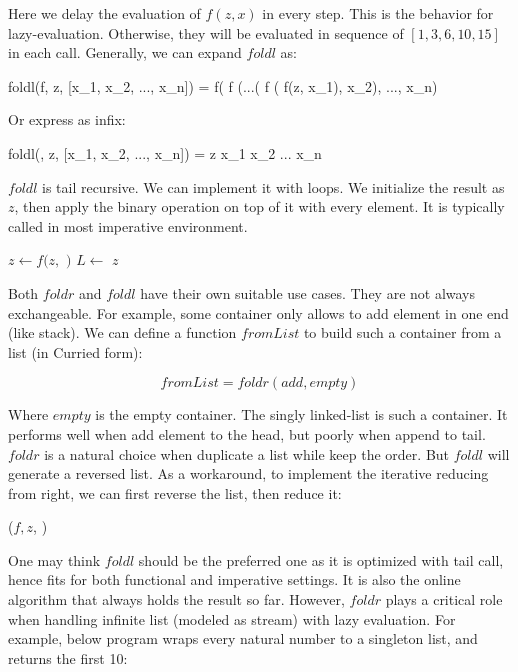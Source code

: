 \documentclass[b5paper]{article}
\begin{document}
Here we delay the evaluation of $f(z, x)$ in every step. This is the behavior for lazy-evaluation. Otherwise, they will be evaluated in sequence of $[1, 3, 6, 10, 15]$ in each call. Generally, we can expand $foldl$ as:

\be
foldl(f, z, [x_1, x_2, ..., x_n]) = f( f (...( f ( f(z, x_1), x_2), ..., x_n)
\ee

Or express as infix:

\be
foldl(\oplus, z, [x_1, x_2, ..., x_n]) = z \oplus x_1 \oplus x_2 \oplus ... \oplus x_n
\ee

$foldl$ is tail recursive. We can implement it with loops. We initialize the result as $z$, then apply the binary operation on top of it with every element. It is typically called  in most imperative environment.

\begin{algorithmic}[1]
    \State $z \gets f(z, $  $)$
    \State $L \gets$ 
  \EndWhile
  \State \Return $z$
\EndFunction
\end{algorithmic}

Both $foldr$ and $foldl$ have their own suitable use cases. They are not always exchangeable. For example, some container only allows to add element in one end (like stack). We can define a function $\textit{fromList}$ to build such a container from a list (in Curried form):

\[
\textit{fromList} = foldr(add, empty)
\]

Where $empty$ is the empty container. The singly linked-list is such a container. It performs well when add element to the head, but poorly when append to tail. $foldr$ is a natural choice when duplicate a list while keep the order. But $foldl$ will generate a reversed list. As a workaround, to implement the iterative reducing from right, we can first reverse the list, then reduce it:

\begin{algorithmic}[1]
  \State \Return {}($f, z$, )
\EndFunction
\end{algorithmic}

One may think $foldl$ should be the preferred one as it is optimized with tail call, hence fits for both functional and imperative settings. It is also the online algorithm that always holds the result so far. However, $foldr$ plays a critical role when handling infinite list (modeled as stream) with lazy evaluation. For example, below program wraps every natural number to a singleton list, and returns the first 10:
\end{document}

